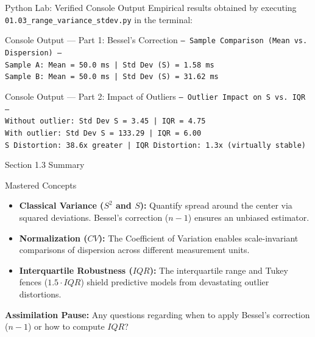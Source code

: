 \documentclass[aspectratio=169,xcolor={dvipsnames,table}]{beamer}
\begin{document}
\begin{frame}{Python Lab: Verified Console Output}
  Empirical results obtained by executing \texttt{01.03\_range\_variance\_stdev.py} in the terminal:
  \vspace{0.6em}

  \begin{block}{\footnotesize Console Output — Part 1: Bessel's Correction}
    {\fontsize{6.5pt}{7.5pt}\selectfont
    \texttt{--- Sample Comparison (Mean vs. Dispersion) ---} \\
    \texttt{Sample A: Mean = 50.0 ms | Std Dev (S) = 1.58 ms} \\
    \texttt{Sample B: Mean = 50.0 ms | Std Dev (S) = 31.62 ms}
    }
  \end{block}

  \vspace{0.3em}
  \begin{alertblock}{\footnotesize Console Output — Part 2: Impact of Outliers}
    {\fontsize{6.5pt}{7.5pt}\selectfont
    \texttt{--- Outlier Impact on S vs. IQR ---} \\
    \texttt{Without outlier: Std Dev S = 3.45   | IQR = 4.75} \\
    \texttt{With outlier:    Std Dev S = 133.29 | IQR = 6.00} \\
    \texttt{S Distortion: 38.6x greater       | IQR Distortion: 1.3x (virtually stable)}
    }
  \end{alertblock}
\end{frame}





\begin{frame}{Section 1.3 Summary}
  \begin{block}{Mastered Concepts}
    \begin{itemize}
      \item \textbf{Classical Variance ($S^2$ and $S$):} Quantify spread around the center via squared deviations. Bessel's correction ($n-1$) ensures an unbiased estimator. \pause
      \item \textbf{Normalization ($CV$):} The Coefficient of Variation enables scale-invariant comparisons of dispersion across different measurement units. \pause
      \item \textbf{Interquartile Robustness ($IQR$):} The interquartile range and Tukey fences ($1.5 \cdot IQR$) shield predictive models from devastating outlier distortions.
    \end{itemize}
  \end{block}
  \pause
  \vspace{0.6em}
  \begin{center}
    \color{TecAzulOscuro}\textbf{Assimilation Pause:} Any questions regarding when to apply Bessel's correction ($n-1$) or how to compute $IQR$?
    \color{black}
  \end{center}
\end{frame}
\end{document}
